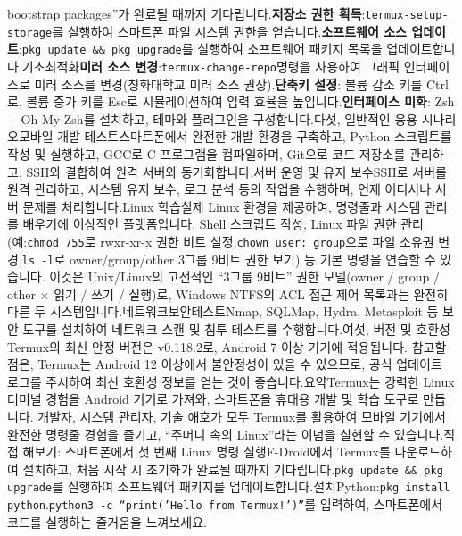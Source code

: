 bootstrap packages”가 완료될 때까지 기다립니다.\textbf{저장소 권한 획득}:\texttt{termux-\allowbreak setup-\allowbreak storage}를 실행하여 스마트폰 파일 시스템 권한을 얻습니다.\textbf{소프트웨어 소스 업데이트}:\texttt{pkg update \&\& pkg upgrade}를 실행하여 소프트웨어 패키지 목록을 업데이트합니다.기초최적화\textbf{미러 소스 변경}:\texttt{termux-\allowbreak change-\allowbreak repo}명령을 사용하여 그래픽 인터페이스로 미러 소스를 변경(칭화대학교 미러 소스 권장).\textbf{단축키 설정}: 볼륨 감소 키를 Ctrl로, 볼륨 증가 키를 Esc로 시뮬레이션하여 입력 효율을 높입니다.\textbf{인터페이스 미화}: Zsh + Oh My Zsh를 설치하고, 테마와 플러그인을 구성합니다.다섯, 일반적인 응용 시나리오모바일 개발 테스트스마트폰에서 완전한 개발 환경을 구축하고, Python 스크립트를 작성 및 실행하고, GCC로 C 프로그램을 컴파일하며, Git으로 코드 저장소를 관리하고, SSH와 결합하여 원격 서버와 동기화합니다.서버 운영 및 유지 보수SSH로 서버를 원격 관리하고, 시스템 유지 보수, 로그 분석 등의 작업을 수행하며, 언제 어디서나 서버 문제를 처리합니다.Linux 학습실제 Linux 환경을 제공하여, 명령줄과 시스템 관리를 배우기에 이상적인 플랫폼입니다. Shell 스크립트 작성, Linux 파일 권한 관리(예:\texttt{chmod 755}로 rwxr-xr-x 권한 비트 설정,\texttt{chown user: group}으로 파일 소유권 변경,\texttt{ls -\allowbreak l}로 owner/group/other 3그룹 9비트 권한 보기) 등 기본 명령을 연습할 수 있습니다. 이것은 Unix/Linux의 고전적인 “3그룹 9비트” 권한 모델(owner / group / other × 읽기 / 쓰기 / 실행)로, Windows NTFS의 ACL 접근 제어 목록과는 완전히 다른 두 시스템입니다.네트워크보안테스트Nmap, SQLMap, Hydra, Metasploit 등 보안 도구를 설치하여 네트워크 스캔 및 침투 테스트를 수행합니다.여섯, 버전 및 호환성Termux의 최신 안정 버전은 v0.118.2로, Android 7 이상 기기에 적용됩니다. 참고할 점은, Termux는 Android 12 이상에서 불안정성이 있을 수 있으므로, 공식 업데이트 로그를 주시하여 최신 호환성 정보를 얻는 것이 좋습니다.요약Termux는 강력한 Linux 터미널 경험을 Android 기기로 가져와, 스마트폰을 휴대용 개발 및 학습 도구로 만듭니다. 개발자, 시스템 관리자, 기술 애호가 모두 Termux를 활용하여 모바일 기기에서 완전한 명령줄 경험을 즐기고, “주머니 속의 Linux”라는 이념을 실현할 수 있습니다.직접 해보기: 스마트폰에서 첫 번째 Linux 명령 실행F-Droid에서 Termux를 다운로드하여 설치하고, 처음 시작 시 초기화가 완료될 때까지 기다립니다.\texttt{pkg update \&\& pkg upgrade}를 실행하여 소프트웨어 패키지를 업데이트합니다.설치Python:\texttt{pkg install python}.\texttt{python3 -\allowbreak c “print('Hello from Termux!')”}를 입력하여, 스마트폰에서 코드를 실행하는 즐거움을 느껴보세요.
